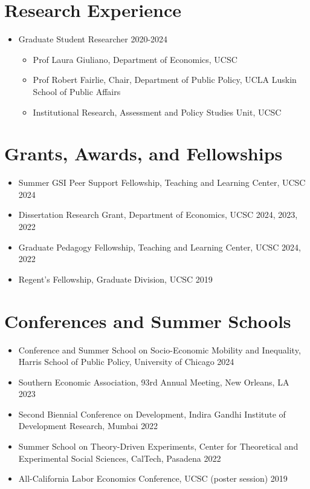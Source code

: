 \documentclass[letter,10pt]{article}
\newcommand{\dateright}[1]{\hfill{\small #1}}
\begin{document}
\section{Research Experience}
\begin{itemize}
    \item Graduate Student Researcher \dateright{2020-2024}
        \begin{itemize}
            \item Prof Laura Giuliano, Department of Economics, UCSC
	 	\item Prof Robert Fairlie, Chair, Department of Public Policy, UCLA Luskin School of Public Affairs 
	 	\item Institutional Research, Assessment and Policy Studies Unit, UCSC
        \end{itemize}
\end{itemize}

\section{Grants, Awards, and Fellowships}
\begin{itemize}
    \item Summer GSI Peer Support Fellowship, Teaching and Learning Center, UCSC \dateright{2024}
    \item Dissertation Research Grant, Department of Economics, UCSC \dateright{2024, 2023, 2022}
    \item Graduate Pedagogy Fellowship, Teaching and Learning Center, UCSC \dateright{2024, 2022}
    \item Regent's Fellowship, Graduate Division, UCSC \dateright{2019}
\end{itemize}

\section{Conferences and Summer Schools}
\begin{itemize}
  \item Conference and Summer School on Socio-Economic Mobility and Inequality, Harris School of Public Policy, University of Chicago \dateright{2024}
  \item Southern Economic Association, 93rd Annual Meeting, New Orleans, LA \dateright{2023}
  \item Second Biennial Conference on Development, Indira Gandhi Institute of Development Research, Mumbai \dateright{2022}
\item Summer School on Theory-Driven Experiments, Center for Theoretical and Experimental Social Sciences, CalTech, Pasadena \dateright{2022}
\item All-California Labor Economics Conference, UCSC (poster session) \dateright{2019}
\end{itemize}
\end{document}
